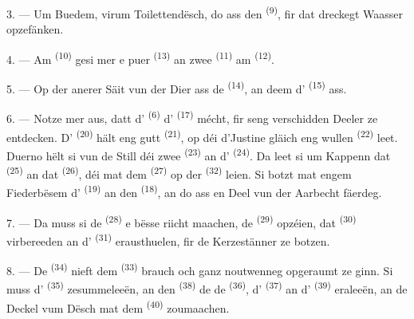 3. --- Um Buedem, virum Toilettendësch, do ass den 
\textsuperscript{(9)}, fir dat dreckegt Waasser opzefänken.

4. --- Am  \textsuperscript{(10)} gesi mer e puer
 \textsuperscript{(13)} an zwee 
\textsuperscript{(11)} am  \textsuperscript{(12)}.

5. --- Op der anerer Säit vun der Dier ass de 
\textsuperscript{(14)}, an deem d' \textsuperscript{(15)} ass.

6. --- Notze mer aus, datt d' \textsuperscript{(6)}
d' \textsuperscript{(17)} mécht, fir seng verschidden Deeler ze
entdecken. D' \textsuperscript{(20)} hält eng gutt
 \textsuperscript{(21)}, op déi d'Justine gläich eng wullen
 \textsuperscript{(22)} leet. Duerno hëlt si vun de Still déi zwee
 \textsuperscript{(23)} an d'
\textsuperscript{(24)}. Da leet si um Kappenn dat 
\textsuperscript{(25)} an dat  \textsuperscript{(26)}, déi mat
dem  \textsuperscript{(27)} op der 
\textsuperscript{(32)} leien. Si botzt mat engem Fiederbësem d'
\textsuperscript{(19)} an den  \textsuperscript{(18)}, an do ass en
Deel vun der Aarbecht fäerdeg.

7. --- Da muss si de  \textsuperscript{(28)} e bësse riicht
maachen, de  \textsuperscript{(29)} opzéien, dat
 \textsuperscript{(30)} virbereeden an d'
\textsuperscript{(31)} erausthuelen, fir de Kerzestänner ze botzen.

\VUsaut{5.0mm}
\VUsaut{3.0mm}

8. --- De  \textsuperscript{(34)} nieft dem 
\textsuperscript{(33)} brauch och ganz noutwenneg opgeraumt ze ginn. Si muss
d' \textsuperscript{(35)} zesummeleeën, an den
 \textsuperscript{(38)} de  de
 \textsuperscript{(36)}, d' \textsuperscript{(37)} an
d' \textsuperscript{(39)} eraleeën, an de Deckel vum Dësch mat dem
 \textsuperscript{(40)} zoumaachen.

